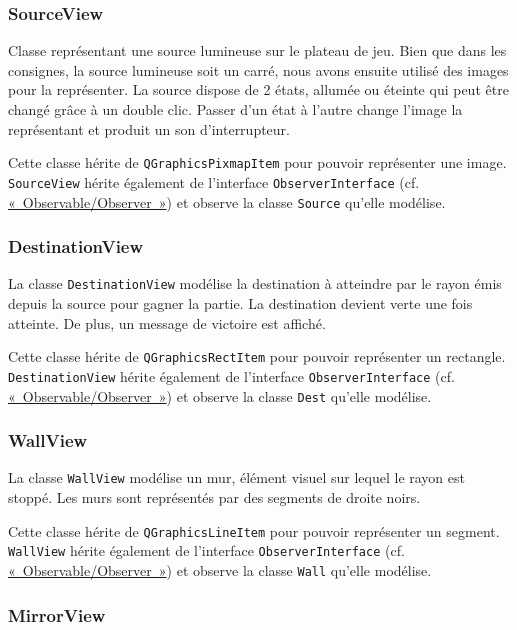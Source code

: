 \documentclass[]{report}
\begin{document}
\subsubsection{\label{SourceView}SourceView}

Classe représentant une source lumineuse sur le plateau de jeu. Bien que dans les consignes, la source lumineuse soit un carré, nous avons ensuite utilisé des images pour la représenter.
La source dispose de 2 états, allumée ou éteinte qui peut être changé grâce à un double clic.
Passer d’un état à l'autre change l'image la représentant et produit un son d’interrupteur.

Cette classe hérite de \texttt{QGraphicsPixmapItem} pour pouvoir représenter une image.
\texttt{SourceView} hérite également de l'interface \texttt{ObserverInterface} (cf. \hyperref[OO]{«~Observable/Observer~»}) et observe
la classe \texttt{Source} qu'elle modélise.

\subsubsection{\label{DestinationView}DestinationView}

La classe \texttt{DestinationView} modélise la destination à atteindre par le rayon émis depuis la source pour gagner la partie.
La destination devient verte une fois atteinte. De plus, un message de victoire est affiché.

Cette classe hérite de \texttt{QGraphicsRectItem} pour pouvoir représenter un rectangle.
\texttt{DestinationView} hérite également de l'interface \texttt{ObserverInterface} (cf. \hyperref[OO]{«~Observable/Observer~»}) et observe
la classe \texttt{Dest} qu'elle modélise.

\subsubsection{\label{WallView}WallView}

La classe \texttt{WallView} modélise un mur, élément visuel sur lequel le rayon est stoppé. 
Les murs sont représentés par des segments de droite noirs.

Cette classe hérite de \texttt{QGraphicsLineItem} pour pouvoir représenter un segment.
\texttt{WallView} hérite également de l'interface \texttt{ObserverInterface} (cf. \hyperref[OO]{«~Observable/Observer~»}) et observe
la classe \texttt{Wall} qu'elle modélise.

\subsubsection{\label{MirrorView}MirrorView}
\end{document}

